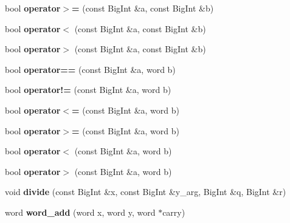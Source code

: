 \begin{DoxyCompactItemize}
bool {\bfseries operator$>$=} (const Big\+Int \&a, const Big\+Int \&b)
\item 
\mbox{\label{namespace_botan_a661756a0681456da17b09d32d0f66a9e}} 
bool {\bfseries operator$<$} (const Big\+Int \&a, const Big\+Int \&b)
\item 
\mbox{\label{namespace_botan_af2298f10cbf9e9d22db9fe7a3f8fb062}} 
bool {\bfseries operator$>$} (const Big\+Int \&a, const Big\+Int \&b)
\item 
\mbox{\label{namespace_botan_a1b1f005950763c0ae5f7f4a16f8c638f}} 
bool {\bfseries operator==} (const Big\+Int \&a, word b)
\item 
\mbox{\label{namespace_botan_a93c510e40758e809adbfe81e6ccbae84}} 
bool {\bfseries operator!=} (const Big\+Int \&a, word b)
\item 
\mbox{\label{namespace_botan_aae5f6ab5fd90bdaf8872135205bee956}} 
bool {\bfseries operator$<$=} (const Big\+Int \&a, word b)
\item 
\mbox{\label{namespace_botan_a7d3cb7aa80d65613274b6ecaa5136951}} 
bool {\bfseries operator$>$=} (const Big\+Int \&a, word b)
\item 
\mbox{\label{namespace_botan_a3b1ec8a493a84e4b8a0cc9c3c6090a6c}} 
bool {\bfseries operator$<$} (const Big\+Int \&a, word b)
\item 
\mbox{\label{namespace_botan_aef792f3bade66468fe384572286f983d}} 
bool {\bfseries operator$>$} (const Big\+Int \&a, word b)
\item 
\mbox{\label{namespace_botan_a7b337ea48c9d452210206c8480fec7ab}} 
void {\bfseries divide} (const Big\+Int \&x, const Big\+Int \&y\+\_\+arg, Big\+Int \&q, Big\+Int \&r)
\item 
\mbox{\label{namespace_botan_aadf18b236a09407a575bc44df6581ba1}} 
word {\bfseries word\+\_\+add} (word x, word y, word $\ast$carry)
\item 
\mbox{\label{namespace_botan_a5898d196aabbdf38c74b7f03b52cfb76}} 

\end{DoxyCompactItemize}

